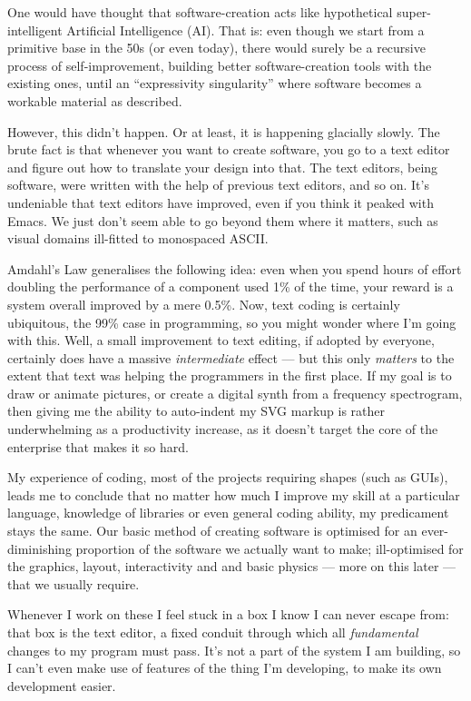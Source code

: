 One would have thought that software-creation acts like hypothetical
super-intelligent Artificial Intelligence (AI). That is: even though we
start from a primitive base in the 50s (or even today), there would
surely be a recursive process of self-improvement, building better
software-creation tools with the existing ones, until an ``expressivity
singularity'' where software becomes a workable material as described.

However, this didn't happen. Or at least, it is happening glacially
slowly. The brute fact is that whenever you want to create software, you
go to a text editor and figure out how to translate your design into
that. The text editors, being software, were written with the help of
previous text editors, and so on. It's undeniable that text editors have
improved, even if you think it peaked with Emacs. We just don't seem
able to go beyond them where it matters, such as visual domains
ill-fitted to monospaced ASCII.

Amdahl's Law generalises the following idea: even when you spend hours
of effort doubling the performance of a component used 1\% of the time,
your reward is a system overall improved by a mere 0.5\%. Now, text
coding is certainly ubiquitous, the 99\% case in programming, so you
might wonder where I'm going with this. Well, a small improvement to
text editing, if adopted by everyone, certainly does have a massive
\emph{intermediate} effect --- but this only \emph{matters} to the
extent that text was helping the programmers in the first place. If my
goal is to draw or animate pictures, or create a digital synth from a
frequency spectrogram, then giving me the ability to auto-indent my SVG
markup is rather underwhelming as a productivity increase, as it doesn't
target the core of the enterprise that makes it so hard.

My experience of coding, most of the projects requiring shapes (such as
GUIs), leads me to conclude that no matter how much I improve my skill
at a particular language, knowledge of libraries or even general coding
ability, my predicament stays the same. Our basic method of creating
software is optimised for an ever-diminishing proportion of the software
we actually want to make; ill-optimised for the graphics, layout,
interactivity and and basic physics --- more on this later --- that we
usually require.

Whenever I work on these I feel stuck in a box I know I can never escape
from: that box is the text editor, a fixed conduit through which all
\emph{fundamental} changes to my program must pass. It's not a part of
the system I am building, so I can't even make use of features of the
thing I'm developing, to make its own development easier.

